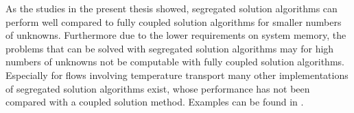 As the studies in the present thesis showed, segregated solution algorithms can perform well compared to fully coupled solution algorithms for smaller numbers of unknowns. Furthermore due to the lower requirements on system memory, the problems that can be solved with segregated solution algorithms may for high numbers of unknowns not be computable with fully coupled solution algorithms. Especially for flows involving temperature transport many other implementations of segregated solution algorithms exist, whose performance has not been compared with a coupled solution method. Examples can be found in \cite{liu84,oliveira01}.

